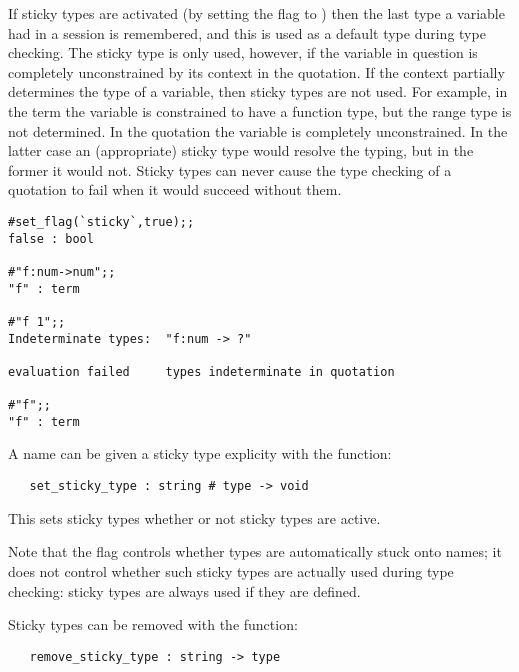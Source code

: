 {{\noindent If sticky types are  activated (by  setting the  flag  to
) then the last type a variable had in  a session  is remembered, and
this is used as a default type during type checking.   The sticky  type is only
used, however, if the variable in question is completely  unconstrained by its
context in the quotation.  If the context partially  determines the  type of a
variable, then sticky types are not used.  For example, in the term 
the variable  is constrained to have a function type, but the range type
is not  determined.    In  the quotation   the  variable  is
completely unconstrained.   In  the latter  case an  (appropriate) sticky type
would resolve the typing, but in the former  it would  not.   Sticky types can
never cause  the type checking  of a  quotation to  fail when  it would succeed
without them.

\setcounter{sessioncount}{1}
\begin{session}\begin{verbatim}
#set_flag(`sticky`,true);;
false : bool

#"f:num->num";;
"f" : term

#"f 1";;
Indeterminate types:  "f:num -> ?"

evaluation failed     types indeterminate in quotation

#"f";;
"f" : term
\end{verbatim}\end{session}

A name can be given a sticky type explicity with the function:

\begin{boxed}
\begin{verbatim}
   set_sticky_type : string # type -> void
\end{verbatim}\end{boxed}

\noindent  This sets sticky types whether or not sticky
types are active.

Note that the flag  controls whether types  are automatically stuck
onto names; it does not control  whether such  sticky types  are actually used
during type checking:  sticky types are always used if they are defined.

Sticky types can be removed with the function:

\begin{boxed}
\begin{verbatim}
   remove_sticky_type : string -> type
\end{verbatim}\end{boxed}

}}
